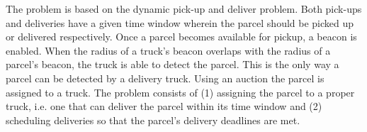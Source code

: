 \documentclass[../main.tex]{subfiles}
\begin{document}
The problem is based on the dynamic pick-up and deliver problem. Both pick-ups and deliveries have a given time window wherein the parcel should be picked up or delivered respectively. Once a parcel becomes available for pickup, a beacon is enabled. When the radius of a truck's beacon overlaps with the radius of a parcel's beacon, the truck is able to detect the parcel. This is the only way a parcel can be detected by a delivery truck. Using an auction the parcel is assigned to a truck. The problem consists of (1) assigning the parcel to a proper truck, i.e. one that can deliver the parcel within its time window and (2) scheduling deliveries so that the parcel's delivery deadlines are met.
\end{document}
